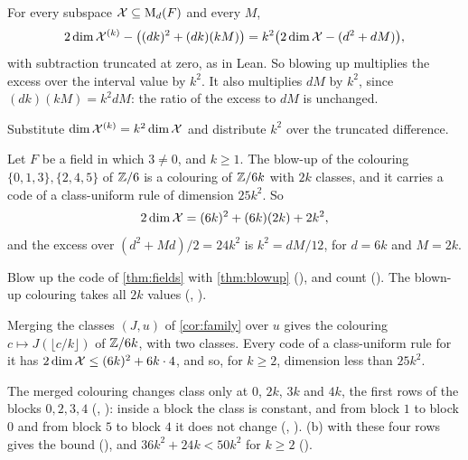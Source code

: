 \begin{corollary}\label{cor:excess}
For every subspace $\mathcal{X}\subseteq\mathrm{M}_d(F)$ and every $M$,
\[
  2\dim\mathcal{X}^{(k)}-\bigl((dk)^2+(dk)(kM)\bigr)=k^2\bigl(2\dim\mathcal{X}-(d^2+dM)\bigr),
\]
with subtraction truncated at zero, as in Lean. So blowing up multiplies the excess over the interval value by $k^2$.
It also multiplies $dM$ by $k^2$, since $(dk)(kM)=k^2dM$: the ratio of the excess to $dM$ is unchanged.
\end{corollary}

\begin{outline}
Substitute $\dim\mathcal{X}^{(k)}=k^2\dim\mathcal{X}$ and distribute $k^2$ over the truncated difference.
\end{outline}

\begin{corollary}\label{cor:family}
Let $F$ be a field in which $3\ne0$, and $k\ge1$. The blow-up of the colouring $\{0,1,3\},\{2,4,5\}$ of $\mathbb{Z}/6$ is a
colouring of $\mathbb{Z}/6k$ with $2k$ classes, and it carries a code of a class-uniform rule of dimension $25k^2$. So
\[
  2\dim\mathcal{X}=(6k)^2+(6k)(2k)+2k^2 ,
\]
and the excess over $(d^2+Md)/2=24k^2$ is $k^2=dM/12$, for $d=6k$ and $M=2k$.
\end{corollary}

\begin{outline}
Blow up the code of \cref{thm:fields} with \cref{thm:blowup} (), and count
(). The blown-up colouring takes all $2k$ values (,
).
\end{outline}

\begin{proposition}\label{prop:merged}
Merging the classes $(J,u)$ of \cref{cor:family} over $u$ gives the colouring $c\mapsto J(\lfloor c/k\rfloor)$ of
$\mathbb{Z}/6k$, with two classes. Every code of a class-uniform rule for it has $2\dim\mathcal{X}\le(6k)^2+6k\cdot4$, and so, for
$k\ge2$, dimension less than $25k^2$.
\end{proposition}

\begin{outline}
The merged colouring changes class only at $0$, $2k$, $3k$ and $4k$, the first rows of the blocks $0,2,3,4$
(, ): inside a block the class is constant, and from block $1$ to block $0$
and from block $5$ to block $4$ it does not change (, ).
(b) with these four rows gives the bound (), and $36k^2+24k<50k^2$ for
$k\ge2$ ().
\end{outline}

